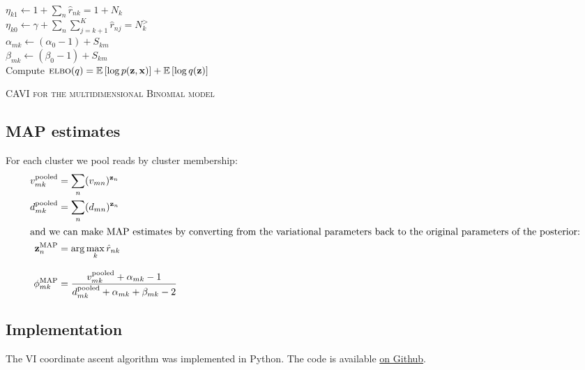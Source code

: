 \documentclass[11pt]{article}
\newcommand{\bx}{\ensuremath{\mathbf{x}}}
\newcommand{\bz}{\ensuremath{\mathbf{z}}}
\newcommand{\EE}[1]{\mathbb{E}\left[#1\right]}
\newcommand{\ELBO}{\textsc{elbo}}
\begin{document}
\begin{algorithm}[h]
{	\vspace{0.1cm}	
	 \\
		\hspace{1cm} $\eta_{k1} \leftarrow 1 + \sum_n \hat{r}_{nk} = 1 + N_k$ \\
		\hspace{1cm} $\eta_{k0} \leftarrow \gamma + \sum_n \sum_{j=k+1}^K \hat{r}_{nj} = N_k^>$\\
		\hspace{1cm} $\alpha_{mk} \leftarrow  (\alpha_0 - 1) + S_{km}$ \\
		\hspace{1cm} $ \beta_{mk} \leftarrow (\beta_0 - 1) + S_{km}$ \\
	\vspace{0.1cm}		
  Compute $\ELBO(q) = \EE{\log p(\bz, \bx)} + \EE{\log q(\bz)}$
}
\caption{\textsc{CAVI for the multidimensional Binomial model}}
\label{alg:cavi}

\end{algorithm}

\subsection{MAP estimates}
For each cluster we pool reads by cluster membership:
\begin{align}
v_{mk}^{\text{pooled}} &= \sum_n (v_{mn})^{\bz_n} \\
d_{mk}^{\text{pooled}} &= \sum_n (d_{mn})^{\bz_n} \\
\intertext{and we can make MAP estimates by converting from the variational parameters back to the original parameters of the posterior:}
\bz_n^{\text{MAP}} &= \arg \max_k \hat{r}_{nk}  \\[8pt]
\phi_{mk}^{\text{MAP}} &= \frac{v_{mk}^{\text{pooled}} + \alpha_{mk} - 1}{d_{mk}^{\text{pooled}} + \alpha_{mk} + \beta_{mk} - 2}
\end{align}


\subsection{Implementation}
The VI coordinate ascent algorithm was implemented in Python. The code is available \href{https://github.com/daviddliu/thesis/tree/master/clustering}{on Github}.
\end{document}
